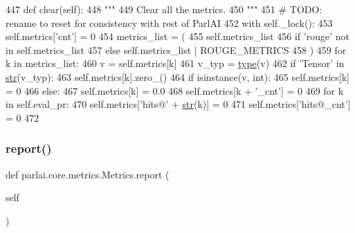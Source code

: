 \begin{DoxyCode}
447     \textcolor{keyword}{def }clear(self):
448         \textcolor{stringliteral}{"""}
449 \textcolor{stringliteral}{        Clear all the metrics.}
450 \textcolor{stringliteral}{        """}
451         \textcolor{comment}{# TODO: rename to reset for consistency with rest of ParlAI}
452         with self.\_lock():
453             self.metrics[\textcolor{stringliteral}{'cnt'}] = 0
454             metrics\_list = (
455                 self.metrics\_list
456                 \textcolor{keywordflow}{if} \textcolor{stringliteral}{'rouge'} \textcolor{keywordflow}{not} \textcolor{keywordflow}{in} self.metrics\_list
457                 \textcolor{keywordflow}{else} self.metrics\_list | ROUGE\_METRICS
458             )
459             \textcolor{keywordflow}{for} k \textcolor{keywordflow}{in} metrics\_list:
460                 v = self.metrics[k]
461                 v\_typ = \hyperlink{namespaceparlai_1_1agents_1_1tfidf__retriever_1_1build__tfidf_ad5dfae268e23f506da084a9efb72f619}{type}(v)
462                 \textcolor{keywordflow}{if} \textcolor{stringliteral}{'Tensor'} \textcolor{keywordflow}{in} \hyperlink{namespacegenerate__task__READMEs_a5b88452ffb87b78c8c85ececebafc09f}{str}(v\_typ):
463                     self.metrics[k].zero\_()
464                 \textcolor{keywordflow}{if} isinstance(v, int):
465                     self.metrics[k] = 0
466                 \textcolor{keywordflow}{else}:
467                     self.metrics[k] = 0.0
468                 self.metrics[k + \textcolor{stringliteral}{'\_cnt'}] = 0
469             \textcolor{keywordflow}{for} k \textcolor{keywordflow}{in} self.eval\_pr:
470                 self.metrics[\textcolor{stringliteral}{'hits@'} + \hyperlink{namespacegenerate__task__READMEs_a5b88452ffb87b78c8c85ececebafc09f}{str}(k)] = 0
471             self.metrics[\textcolor{stringliteral}{'hits@\_cnt'}] = 0
472 \end{DoxyCode}
\mbox{\label{classparlai_1_1core_1_1metrics_1_1Metrics_ae96ffa8a0a1044cdcfcf6cf15fa139ee}} 
\subsubsection{\texorpdfstring{report()}{report()}}
{\footnotesize\ttfamily def parlai.\+core.\+metrics.\+Metrics.\+report (\begin{DoxyParamCaption}\item[{}]{self }\end{DoxyParamCaption})}

